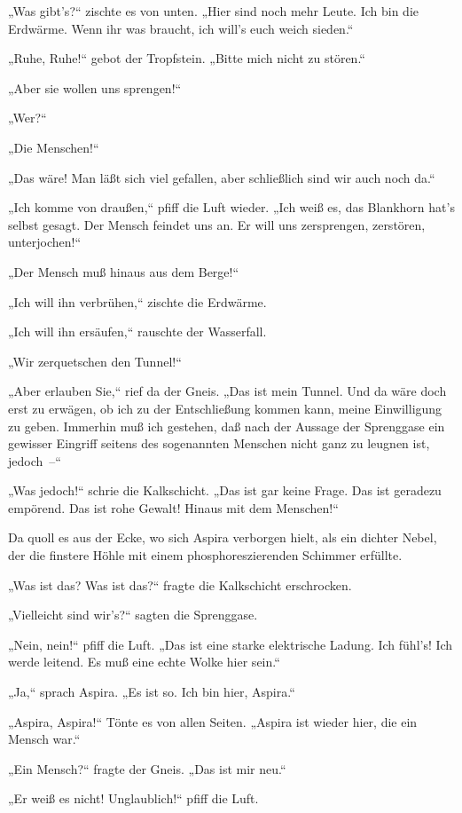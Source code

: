 „Was gibt's?“ zischte es von unten. „Hier sind noch mehr Leute. Ich
bin die Erdwärme. Wenn ihr was braucht, ich will's euch weich
sieden.“

„Ruhe, Ruhe!“ gebot der Tropfstein. „Bitte mich nicht zu stören.“

„Aber sie wollen uns sprengen!“

„Wer?“

„Die Menschen!“

„Das wäre! Man läßt sich viel gefallen, aber schließlich sind wir
auch noch da.“

„Ich komme von draußen,“ pfiff die Luft wieder. „Ich weiß es, das
Blankhorn hat's selbst gesagt. Der Mensch feindet uns an. Er will
uns zersprengen, zerstören, unterjochen!“

„Der Mensch muß hinaus aus dem Berge!“

„Ich will ihn verbrühen,“ zischte die Erdwärme.

„Ich will ihn ersäufen,“ rauschte der Wasserfall.

„Wir zerquetschen den Tunnel!“

„Aber erlauben Sie,“ rief da der Gneis. „Das ist mein Tunnel. Und
da wäre doch erst zu erwägen, ob ich zu der Entschließung kommen
kann, meine Einwilligung zu geben. Immerhin muß ich gestehen, daß
nach der Aussage der Sprenggase ein gewisser Eingriff seitens des
sogenannten Menschen nicht ganz zu leugnen ist, jedoch~–“

„Was jedoch!“ schrie die Kalkschicht. „Das ist gar keine Frage. Das
ist geradezu empörend. Das ist rohe Gewalt! Hinaus mit dem
Menschen!“

Da quoll es aus der Ecke, wo sich Aspira verborgen hielt, als ein
dichter Nebel, der die finstere Höhle mit einem phosphoreszierenden
Schimmer erfüllte.

„Was ist das? Was ist das?“ fragte die Kalkschicht erschrocken.

„Vielleicht sind wir's?“ sagten die Sprenggase.

„Nein, nein!“ pfiff die Luft. „Das ist eine starke elektrische
Ladung. Ich fühl's! Ich werde leitend. Es muß eine echte Wolke hier
sein.“

„Ja,“ sprach Aspira. „Es ist so. Ich bin hier, Aspira.“

„Aspira, Aspira!“ Tönte es von allen Seiten. „Aspira ist wieder
hier, die ein Mensch war.“

„Ein Mensch?“ fragte der Gneis. „Das ist mir neu.“

„Er weiß es nicht! Unglaublich!“ pfiff die Luft.

